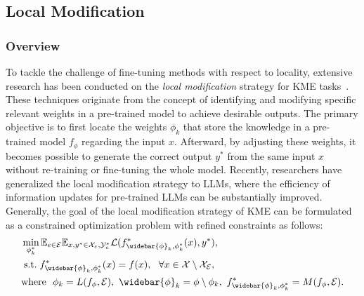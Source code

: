 \documentclass[acmsmall, screen]{acmart}
\def \st{\;\text{s.t.}\;}
\begin{document}

\subsection{Local Modification}\label{sec:local}

\subsubsection{\textbf{Overview}}
To tackle the challenge of fine-tuning methods with respect to locality, extensive research has been conducted on the \textit{local modification} strategy for KME tasks~\cite{SERAC,yao2023editing}. These techniques originate from the concept of identifying and modifying specific relevant weights in a pre-trained model to achieve desirable outputs. The primary objective is to first locate the weights $\phi_{k}$ that store the knowledge in a pre-trained model $f_{\phi}$ regarding the input $x$. Afterward, by adjusting these weights, it becomes possible to generate the correct output $y^{*}$ from the same input $x$ without re-training or fine-tuning the whole model. Recently, researchers have generalized the local modification strategy to LLMs, where the efficiency of information updates for pre-trained LLMs can be substantially improved. Generally, the goal of the local modification strategy of KME can be formulated as a constrained optimization problem with refined constraints as follows:
\begin{equation} \label{eq:local}
        \begin{aligned}
        & \min_{\phi^{*}_{k}} \mathbb{E}_{e \in \mathcal{E}} \mathbb{E}_{x, y^* \in \mathcal{X}_e, \mathcal{Y}^*_e} \mathcal{L} (f^*_{\widebar{\phi}_{k}, \phi_{k}^{*}}(x), y^*), \\
        &\st f^*_{\widebar{\phi}_{k}, \phi_{k}^{*}}(x)=f(x),\ \  \forall x\in \mathcal{X}\setminus \mathcal{X}_\mathcal{E},\\
        & \text{where} \ \  \phi_k = L(f_{\phi}, \mathcal{E}),\ \widebar{\phi}_k = \phi \setminus \phi_k, \ f^*_{\widebar{\phi}_k, \phi^{*}_k}=M(f_{\phi}, \mathcal{E}).\\
    \end{aligned}
\end{equation}
\end{document}
